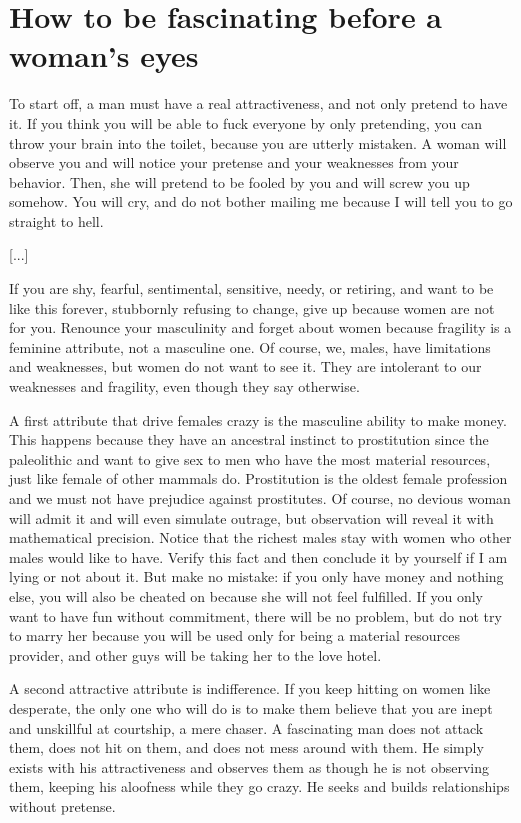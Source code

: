 \section{How to be fascinating before a woman's eyes}

\par To start off, a man must have a real attractiveness, and not only pretend to have it. If you think you will be able to fuck everyone by only pretending, you can throw your brain into the toilet, because you are utterly mistaken. A woman will observe you and will notice your pretense and your weaknesses from your behavior. Then, she will pretend to be fooled by you and will screw you up somehow. You will cry, and do not bother mailing me because I will tell you to go straight to hell.

[...]

\par If you are shy, fearful, sentimental, sensitive, needy, or retiring, and want to be like this forever, stubbornly refusing to change, give up because women are not for you. Renounce your masculinity and forget about women because fragility is a feminine attribute, not a masculine one. Of course, we, males, have limitations and weaknesses, but women do not want to see it. They are intolerant to our weaknesses and fragility, even though they say otherwise.

\par A first attribute that drive females crazy is the masculine ability to make money. This happens because they have an ancestral instinct to prostitution since the paleolithic and want to give sex to men who have the most material resources, just like female of other mammals do. Prostitution is the oldest female profession and we must not have prejudice against prostitutes. Of course, no devious woman will admit it and will even simulate outrage, but observation will reveal it with mathematical precision. Notice that the richest males stay with women who other males would like to have. Verify this fact and then conclude it by yourself if I am lying or not about it. But make no mistake: if you only have money and nothing else, you will also be cheated on because she will not feel fulfilled. If you only want to have fun without commitment, there will be no problem, but do not try to marry her because you will be used only for being a material resources provider, and other guys will be taking her to the love hotel.

\par A second attractive attribute is indifference. If you keep hitting on women like desperate, the only one who will do is to make them believe that you are inept and unskillful at courtship, a mere chaser. A fascinating man does not attack them, does not hit on them, and does not mess around with them. He simply exists with his attractiveness and observes them as though he is not observing them, keeping his aloofness while they go crazy. He seeks and builds relationships without pretense.

